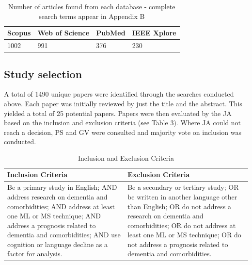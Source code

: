 \documentclass[10pt, letterpaper, twoside, openany]{thesis}
\begin{document}
\begin{table}[H]
	\begin{center}
	\begin{tabular}{ | p{3cm} | p{3cm} | p{3cm} | p{3cm} | }
	\hline
	Scopus & Web of Science & PubMed & IEEE Xplore \\ \hline
	1002 & 991 & 376 & 230 \\ 
	\hline
	\end{tabular}
	\end{center}
	\caption[Table caption text]{Number of articles found from each database - complete search terms appear in Appendix B}
	\label{table:name}
\end{table}

\subsection{Study selection} 
A total of 1490 unique papers were identified through the searches conducted above.  Each paper was initially reviewed by just the title and the abstract. This yielded a total of 25 potential papers. Papers were then evaluated by the JA based on the inclusion and exclusion criteria  (see Table 3). Where JA could not reach a decision, PS and GV were consulted and majority vote on inclusion was conducted.

\begin{table}[H]
	\begin{center}
	\begin{tabular}{ | p{6cm} | p{6cm} | }
	\hline
	Inclusion Criteria & Exclusion Criteria \\ \hline
	Be a primary study in English; AND address research on dementia and comorbidities; AND address at least one ML or MS technique; AND address a prognosis related to dementia and comorbidities; AND use cognition or language decline as a factor for analysis. &
	Be a secondary or tertiary study; OR be written in another language other than English; OR do not address a research on dementia and comorbidities; OR do not address at least one ML or MS technique; OR do not address a prognosis related to dementia and comorbidities. \\
	\hline 
	\end{tabular}
	\caption[Table caption text]{Inclusion and Exclusion Criteria}
	\label{table:name}
	\end{center}
\end{table}
 
\end{document}
